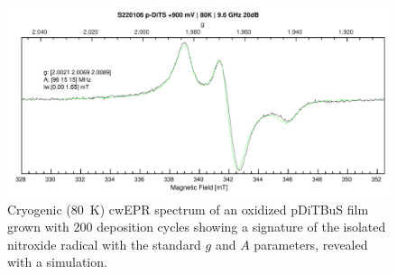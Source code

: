 \begin{figure}[]
\center
	\includegraphics[width=1\textwidth]{./operando_epr/figures/CRYO/S220106_p-DiTS_OX_80K_CW_SIM.pdf}
	\caption{Cryogenic (80~K) cwEPR spectrum of an oxidized pDiTBuS film grown with 200 deposition cycles showing a signature of the isolated nitroxide radical with the standard $g$ and $A$ parameters, revealed with a simulation.}
	\label{fig:cwEPR_CRYO_DiTBuS_CHG_SIM}
\end{figure}



